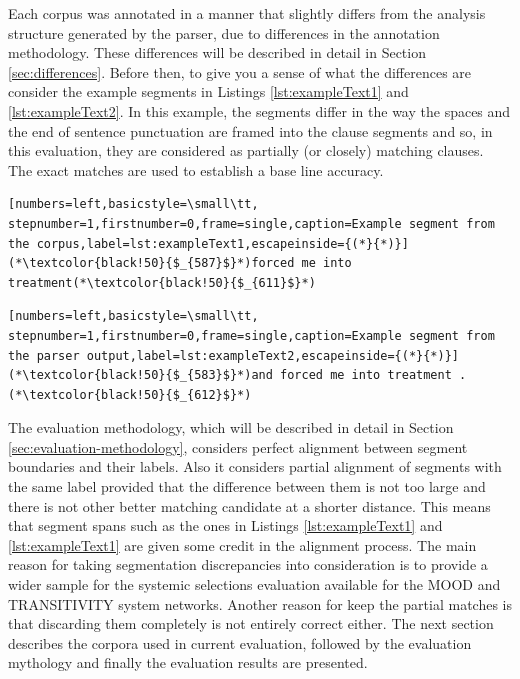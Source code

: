    Each corpus was annotated in a manner that slightly differs from the analysis structure generated by the parser, due to differences in the annotation methodology. These differences will be described in detail in Section \ref{sec:differences}. Before then, to give you a sense of what the differences are consider the example segments in Listings \ref{lst:exampleText1} and \ref{lst:exampleText2}. In this example, the segments differ in the way the spaces and the end of sentence punctuation are framed into the clause segments and so, in this evaluation, they are considered as partially (or closely) matching clauses. The exact matches are used to establish a base line accuracy. 
    
\noindent
\begin{minipage}{\linewidth}
\begin{lstlisting}[numbers=left,basicstyle=\small\tt, stepnumber=1,firstnumber=0,frame=single,caption=Example segment from the corpus,label=lst:exampleText1,escapeinside={(*}{*)}]
(*\textcolor{black!50}{$_{587}$}*)forced me into treatment(*\textcolor{black!50}{$_{611}$}*)
\end{lstlisting}
\end{minipage}

\noindent
\begin{minipage}{\linewidth}
\begin{lstlisting}[numbers=left,basicstyle=\small\tt, stepnumber=1,firstnumber=0,frame=single,caption=Example segment from the parser output,label=lst:exampleText2,escapeinside={(*}{*)}]
(*\textcolor{black!50}{$_{583}$}*)and forced me into treatment .(*\textcolor{black!50}{$_{612}$}*)
\end{lstlisting}
\end{minipage}    

The evaluation methodology, which will be described in detail in Section \ref{sec:evaluation-methodology}, considers perfect alignment between segment boundaries and their labels. Also it considers partial alignment of segments with the same label provided that the difference between them is not too large and there is not other better matching candidate at a shorter distance. This means that segment spans such as the ones in Listings \ref{lst:exampleText1} and \ref{lst:exampleText1} are given some credit in the alignment process. The main reason for taking segmentation discrepancies into consideration is to provide a wider sample for the systemic selections evaluation available for the MOOD and TRANSITIVITY system networks. Another reason for keep the partial matches is that discarding them completely is not entirely correct either. The next section describes the corpora used in current evaluation, followed by the evaluation mythology and finally the evaluation results are presented.

